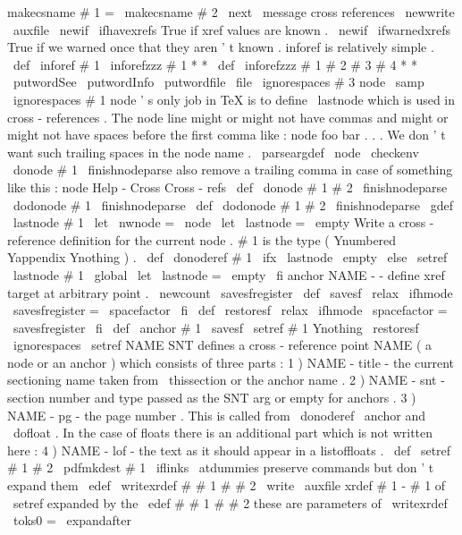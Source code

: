 {{{{{makecsname
{
#
1
}
=
\
makecsname
{
#
2
}
}
%
}
%
\
next
}
\
message
{
cross
references
}
\
newwrite
\
auxfile
\
newif
\
ifhavexrefs
%
True
if
xref
values
are
known
.
\
newif
\
ifwarnedxrefs
%
True
if
we
warned
once
that
they
aren
'
t
known
.
%
inforef
is
relatively
simple
.
\
def
\
inforef
#
1
{
\
inforefzzz
#
1
*
*
}
\
def
\
inforefzzz
#
1
#
2
#
3
#
4
*
*
{
\
putwordSee
{
}
\
putwordInfo
{
}
\
putwordfile
{
}
\
file
{
\
ignorespaces
#
3
{
}
}
node
\
samp
{
\
ignorespaces
#
1
{
}
}
}
%
node
'
s
only
job
in
TeX
is
to
define
\
lastnode
which
is
used
in
%
cross
-
references
.
The
node
line
might
or
might
not
have
commas
and
%
might
or
might
not
have
spaces
before
the
first
comma
like
:
%
node
foo
bar
.
.
.
%
We
don
'
t
want
such
trailing
spaces
in
the
node
name
.
%
\
parseargdef
\
node
{
\
checkenv
{
}
\
donode
#
1
\
finishnodeparse
}
%
%
also
remove
a
trailing
comma
in
case
of
something
like
this
:
%
node
Help
-
Cross
Cross
-
refs
\
def
\
donode
#
1
#
2
\
finishnodeparse
{
\
dodonode
#
1
\
finishnodeparse
}
\
def
\
dodonode
#
1
#
2
\
finishnodeparse
{
\
gdef
\
lastnode
{
#
1
}
}
\
let
\
nwnode
=
\
node
\
let
\
lastnode
=
\
empty
%
Write
a
cross
-
reference
definition
for
the
current
node
.
#
1
is
the
%
type
(
Ynumbered
Yappendix
Ynothing
)
.
%
\
def
\
donoderef
#
1
{
%
\
ifx
\
lastnode
\
empty
\
else
\
setref
{
\
lastnode
}
{
#
1
}
%
\
global
\
let
\
lastnode
=
\
empty
\
fi
}
%
anchor
{
NAME
}
-
-
define
xref
target
at
arbitrary
point
.
%
\
newcount
\
savesfregister
%
\
def
\
savesf
{
\
relax
\
ifhmode
\
savesfregister
=
\
spacefactor
\
fi
}
\
def
\
restoresf
{
\
relax
\
ifhmode
\
spacefactor
=
\
savesfregister
\
fi
}
\
def
\
anchor
#
1
{
\
savesf
\
setref
{
#
1
}
{
Ynothing
}
\
restoresf
\
ignorespaces
}
%
\
setref
{
NAME
}
{
SNT
}
defines
a
cross
-
reference
point
NAME
(
a
node
or
an
%
anchor
)
which
consists
of
three
parts
:
%
1
)
NAME
-
title
-
the
current
sectioning
name
taken
from
\
thissection
%
or
the
anchor
name
.
%
2
)
NAME
-
snt
-
section
number
and
type
passed
as
the
SNT
arg
or
%
empty
for
anchors
.
%
3
)
NAME
-
pg
-
the
page
number
.
%
%
This
is
called
from
\
donoderef
\
anchor
and
\
dofloat
.
In
the
case
of
%
floats
there
is
an
additional
part
which
is
not
written
here
:
%
4
)
NAME
-
lof
-
the
text
as
it
should
appear
in
a
listoffloats
.
%
\
def
\
setref
#
1
#
2
{
%
\
pdfmkdest
{
#
1
}
%
\
iflinks
{
%
\
atdummies
%
preserve
commands
but
don
'
t
expand
them
\
edef
\
writexrdef
#
#
1
#
#
2
{
%
\
write
\
auxfile
{
xrdef
{
#
1
-
%
#
1
of
\
setref
expanded
by
the
\
edef
#
#
1
}
{
#
#
2
}
}
%
these
are
parameters
of
\
writexrdef
}
%
\
toks0
=
\
expandafter
}}}}
